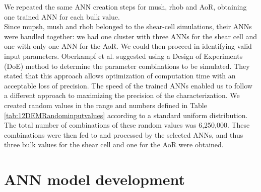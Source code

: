 We repeated the same \acs{ANN} creation steps for \acs{mush}, \acs{rhob}
and \acs{AoR}, obtaining one trained \acs{ANN} for each bulk value. \\
Since \acs{mupsh}, \acs{mush} and \acs{rhob} belonged to the shear-cell
simulations, their \acs{ANNs} were handled together: we had one cluster with three 
\acs{ANNs} for the shear cell and one with only one \acs{ANN} for the \acs{AoR}.
We could then proceed in identifying valid input parameters.
Oberkampf et al. \cite{RefWorks:160} suggested using a Design of Experiments
(\acs{DoE}) method to determine the parameter combinations to be simulated.
They stated that this approach allows optimization of computation time
with an acceptable loss of precision.
The speed of the trained \acs{ANNs} enabled us to follow a different approach to
maximizing the precision of the characterization.
We created random values
in the range and numbers defined in Table \ref{tab:12DEMRandominputvalues}
according to a standard uniform distribution.
The total number of combinations of these random values was 6,250,000.
These combinations were then fed to and processed by the selected
\acs{ANNs}, and thus three bulk values for the shear
cell and one for the \acs{AoR} were obtained.




\section{ANN model development}
\label{sec:annmodeldev}



